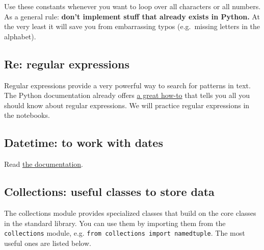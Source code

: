 \documentclass[12pt]{book}
\begin{document}
Use these constants whenever you want to loop over all characters or all
numbers. As a general rule: \textbf{don't implement stuff that already
exists in Python.} At the very least it will save you from embarrassing
typos (e.g.\ missing letters in the alphabet).

\subsection{Re: regular expressions}\label{re-regular-expressions}

Regular expressions provide a very powerful way to search for patterns in text. The Python documentation already offers \href{https://docs.python.org/3/howto/regex.html\#regex-howto}{a great how-to} that tells you all you should know about regular expressions. We will practice regular expressions in the notebooks.

\subsection{Datetime: to work with dates}

Read \href{https://docs.python.org/3.5/library/datetime.html}{the documentation}.

\subsection{Collections: useful classes to store data}

The collections module provides specialized classes that build on the core classes in the standard library. You can use them by importing them from the \texttt{collections} module, e.g. \texttt{from\ collections\ import\ namedtuple}. The most useful ones are listed below.
\end{document}
